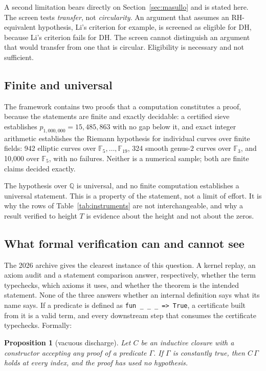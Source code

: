 \documentclass[11pt,a4paper]{article}
\newtheorem{proposition}{Proposition}
\newcommand{\RH}{\mathrm{RH}}
\newcommand{\Q}{\mathbb{Q}}
\newcommand{\verdict}[1]{\textsf{#1}}
\begin{document}
A second limitation bears directly on Section~\ref{sec:masullo} and is stated here. The
screen tests \emph{transfer}, not \emph{circularity}. An argument that assumes an
$\RH$-equivalent hypothesis, Li's criterion for example, is screened as \verdict{eligible} for
DH, because Li's criterion fails for DH. The screen cannot distinguish an argument that would
transfer from one that is circular. Eligibility is necessary and not sufficient.

\subsection{Finite and universal}

The framework contains two proofs that a computation constitutes a proof, because the
statements are finite and exactly decidable: a certified sieve establishes
$p_{1{,}000{,}000}=15{,}485{,}863$ with no gap below it, and exact integer arithmetic establishes
the Riemann hypothesis for individual curves over finite fields: 942 elliptic curves over
$\mathbb{F}_{5},\dots,\mathbb{F}_{19}$, 324 smooth genus-$2$ curves over $\mathbb{F}_{3}$, and
10{,}000 over $\mathbb{F}_{5}$, with no failures. Neither is a numerical sample; both are finite
claims decided exactly.

The hypothesis over $\Q$ is universal, and no finite computation establishes a universal
statement. This is a property of the statement, not a limit of effort. It is why the rows of
Table~\ref{tab:instruments} are not interchangeable, and why a result verified to height $T$ is
evidence about the height and not about the zeros.

\subsection{What formal verification can and cannot see}

The 2026 archive gives the clearest instance of this question. A kernel replay, an axiom
audit and a statement comparison answer, respectively, whether the term typechecks, which axioms
it uses, and whether the theorem is the intended statement. None of the three answers whether an
internal definition says what its name says. If a predicate is defined as
\texttt{fun \_ \_ \_ => True}, a certificate built from it is a valid term, and every downstream
step that consumes the certificate typechecks. Formally:

\begin{proposition}[vacuous discharge]
\label{prop:vacuous}
Let $C$ be an inductive closure with a constructor accepting any proof of a predicate $\Gamma$.
If $\Gamma$ is constantly true, then $C\,\Gamma$ holds at every index, and the proof has used no
hypothesis.
\end{proposition}
\end{document}

